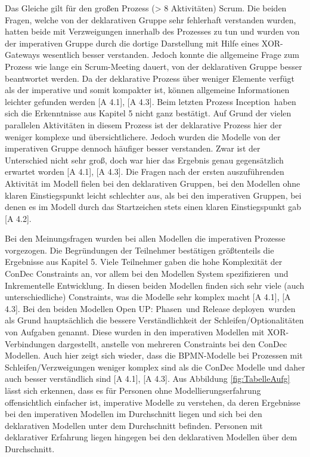 Das Gleiche gilt für den großen Prozess (> 8 Aktivitäten) \grqq Scrum\grqq. Die beiden Fragen, welche von der deklarativen Gruppe sehr fehlerhaft verstanden wurden, hatten beide mit Verzweigungen innerhalb des Prozesses zu tun und wurden von der imperativen Gruppe durch die dortige Darstellung mit Hilfe eines XOR-Gateways wesentlich besser verstanden. Jedoch konnte die allgemeine Frage zum Prozess wie lange ein Scrum-Meeting dauert, von der deklarativen Gruppe besser beantwortet werden. Da der deklarative Prozess über weniger Elemente verfügt als der imperative und somit kompakter ist, können allgemeine Informationen leichter gefunden werden [A 4.1], [A 4.3]. \newline
Beim letzten Prozess \grqq Inception\grqq \ haben sich die Erkenntnisse aus Kapitel 5 nicht ganz bestätigt. Auf Grund der vielen parallelen Aktivitäten in diesem Prozess ist der deklarative Prozess hier der weniger komplexe und übersichtlichere. Jedoch wurden die Modelle von der imperativen Gruppe dennoch häufiger besser verstanden. Zwar ist der Unterschied nicht sehr groß, doch war hier das Ergebnis genau gegensätzlich erwartet worden [A 4.1], [A 4.3].\newline
Die Fragen nach der ersten auszuführenden Aktivität im Modell fielen bei den deklarativen Gruppen, bei den Modellen ohne klaren Einstiegspunkt leicht schlechter aus, als bei den imperativen Gruppen, bei denen es im Modell durch das Startzeichen stets einen klaren Einstiegspunkt gab [A 4.2]. \newline

Bei den Meinungsfragen wurden bei allen Modellen die imperativen Prozesse vorgezogen. Die Begründungen der Teilnehmer bestätigen größtenteils die Ergebnisse aus Kapitel 5. Viele Teilnehmer gaben die hohe Komplexität der ConDec Constraints an, vor allem bei den Modellen \grqq System spezifizieren\grqq \ und \grqq Inkrementelle Entwicklung\grqq. In diesen beiden Modellen finden sich sehr viele (auch unterschiedliche) Constraints, was die Modelle sehr komplex macht [A 4.1], [A 4.3].\newline
Bei den beiden Modellen \grqq Open UP: Phasen\grqq \ und \grqq Release deployen\grqq \ wurden als Grund hauptsächlich die bessere Verständlichkeit der Schleifen/Optionalitäten von Aufgaben genannt. Diese wurden in den imperativen Modellen mit XOR-Verbindungen dargestellt, anstelle von mehreren Constraints bei den ConDec Modellen. Auch hier zeigt sich wieder, dass die BPMN-Modelle bei Prozessen mit Schleifen/Verzweigungen weniger komplex sind als die ConDec Modelle und daher auch besser verständlich sind [A 4.1], [A 4.3].\newline
Aus Abbildung \ref{fig:TabelleAufg} lässt sich erkennen, dass es für Personen ohne Modellierungserfahrung offensichtlich einfacher ist, imperative Modelle zu verstehen, da deren Ergebnisse bei den imperativen Modellen im Durchschnitt liegen und sich bei den deklarativen Modellen unter dem Durchschnitt befinden. Personen mit deklarativer Erfahrung liegen hingegen bei den deklarativen Modellen über dem Durchschnitt.\newline



